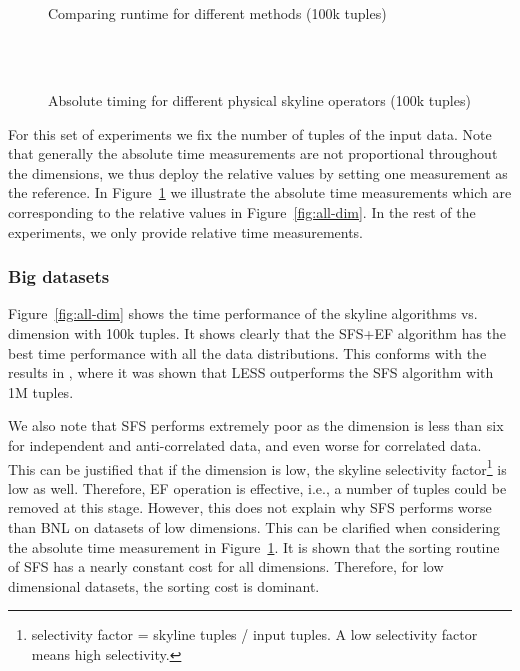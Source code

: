 \begin{figure}[htbp]
\centering%
\begin{minipage}{\onecolumnwidth}%
\\
\\
%
\caption{Comparing runtime for different methods (100k tuples)}%
\label{fig:all-dim}%
\end{minipage}%
\hspace{\columnsep}%
\begin{minipage}{\onecolumnwidth}%
\\
\\
%
\caption{Absolute timing for different physical skyline operators (100k tuples)}%
\label{fig:all-dim-absolute}
\end{minipage}%
\end{figure}

For this set of experiments we fix the number of tuples of the input data.
Note that generally the absolute time measurements are not proportional 
throughout the dimensions, we thus deploy the relative values by setting one measurement as
the reference. 
In Figure~\ref{fig:all-dim-absolute}
we illustrate the absolute time measurements which are corresponding to
the relative values in Figure~\ref{fig:all-dim}. 
In the rest of the experiments, we only provide relative time measurements.


\subsubsection{Big datasets}
\label{sec:big-datasets}
Figure~\ref{fig:all-dim} shows the time performance of the skyline
algorithms vs. dimension with 100k tuples. It shows clearly that the
SFS+EF algorithm has the best time performance with all the data
distributions.  This conforms with the results in \cite{Godfrey2007},
where it was shown that LESS outperforms the SFS algorithm with 1M
tuples.

We also note that SFS performs extremely poor as the dimension is less
than six for independent and anti-correlated data, and even worse for
correlated data.  This can be justified that if the dimension is low,
the skyline selectivity factor\footnote{selectivity factor = skyline
tuples / input tuples. A low selectivity factor means high
selectivity.}  is low as well. Therefore, EF operation is effective,
i.e., a number of tuples could be removed at this stage. However, this
does not explain why SFS performs worse than BNL on datasets of low
dimensions. This can be clarified when considering the absolute time
measurement in Figure~\ref{fig:all-dim-absolute}.  It is shown that
the sorting routine of SFS has a nearly constant cost for all
dimensions. Therefore, for low dimensional datasets, the sorting cost
is dominant.

